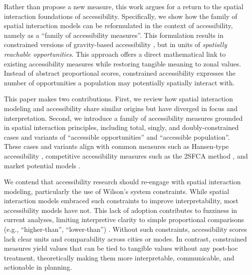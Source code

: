 \documentclass[
  10pt,
  letterpaper,
]{article}
\begin{document}
Rather than propose a new measure, this work argues for a return to the
spatial interaction foundations of accessibility. Specifically, we show
how the family of spatial interaction models \citep{wilson1971} can be
reformulated in the context of accessibility, namely as a ``family of
accessibility measures''. This formulation results in constrained
versions of gravity-based accessibility \citep[e.g.,][]{hansen1959}, but
in units of \emph{spatially reachable opportunities}. This approach
offers a direct mathematical link to existing accessibility measures
while restoring tangible meaning to zonal values. Instead of abstract
proportional scores, constrained accessibility expresses the number of
opportunities a population may potentially spatially interact with.

This paper makes two contributions. First, we review how spatial
interaction modeling and accessibility share similar origins but have
diverged in focus and interpretation. Second, we introduce a family of
accessibility measures grounded in spatial interaction principles,
including total, singly, and doubly-constrained cases and variants of
``accessible opportunities'' and ``accessible population''. These cases
and variants align with common measures such as Hansen-type
accessibility \citep{hansen1959}, competitive accessibility measures
such as the 2SFCA method \citep{shen1998, luo2003}, and market potential
models
\citep{harris_market_1954, vickermanAccessibilityAttractionPotential1974}.

We contend that accessibility research should re-engage with spatial
interaction modeling, particularly the use of Wilson's
\citep{wilson1971} system constraints. While spatial interaction models
embraced such constraints to improve interpretability, most
accessibility models have not. This lack of adoption contributes to
fuzziness in current analyses, limiting interpretive clarity to simple
proportional comparisons (e.g., ``higher-than'', ``lower-than'')
\citep{millerAccessibilityMeasurementApplication2018}. Without such
constraints, accessibility scores lack clear units and comparability
across cities or modes. In contrast, constrained measures yield values
that can be tied to tangible values without any post-hoc treatment,
theoretically making them more interpretable, communicable, and
actionable in planning.
\end{document}
